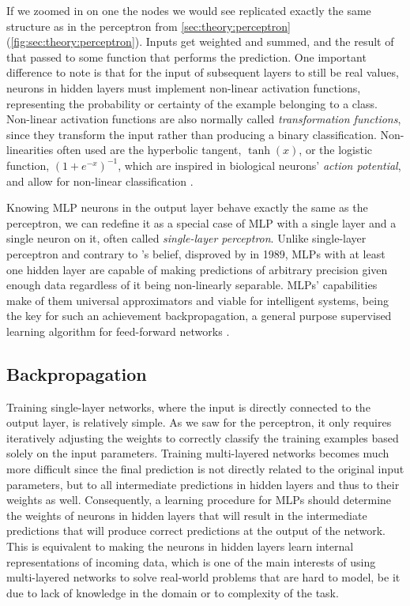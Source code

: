 If we zoomed in on one the nodes we would see replicated exactly the same structure as in the perceptron from \autoref{sec:theory:perceptron} (\autoref{fig:sec:theory:perceptron}).
Inputs get weighted and summed, and the result of that passed to some function that performs the prediction.
One important difference to note is that for the input of subsequent layers to still be real values, neurons in hidden layers must implement non-linear activation functions, representing the probability or certainty of the example belonging to a class.
Non-linear activation functions are also normally called \emph{transformation functions}, since they transform the input rather than producing a binary classification.
Non-linearities often used are the hyperbolic tangent, $\tanh(x)$, or the logistic function, $(1+e^{-x})^{-1}$, which are inspired in biological neurons' \emph{action potential}, and allow for non-linear classification \cite{Thorpe1989}.

Knowing MLP neurons in the output layer behave exactly the same as the perceptron, we can redefine it as a special case of MLP with a single layer and a single neuron on it, often called \emph{single-layer perceptron}.
Unlike single-layer perceptron and contrary to \citeauthor{Minsky1969}'s belief, disproved by \citet{Hornik1989} in 1989, MLPs with at least one hidden layer are capable of making predictions of arbitrary precision given enough data regardless of it being non-linearly separable.
MLPs' capabilities make of them universal approximators and viable for intelligent systems, being the key for such an achievement backpropagation, a general purpose supervised learning algorithm for feed-forward networks \cite{Rumelhart1986}.


\subsection{Backpropagation}
\label{sec:theory:mlp:backpropagation}

Training single-layer networks, where the input is directly connected to the output layer, is relatively simple.
As we saw for the perceptron, it only requires iteratively adjusting the weights to correctly classify the training examples based solely on the input parameters.
Training multi-layered networks becomes much more difficult since the final prediction is not directly related to the original input parameters, but to all intermediate predictions in hidden layers and thus to their weights as well.
Consequently, a learning procedure for MLPs should determine the weights of neurons in hidden layers that will result in the intermediate predictions that will produce correct predictions at the output of the network.
This is equivalent to making the neurons in hidden layers learn internal representations of incoming data, which is one of the main interests of using multi-layered networks to solve real-world problems that are hard to model, be it due to lack of knowledge in the domain or to complexity of the task.

